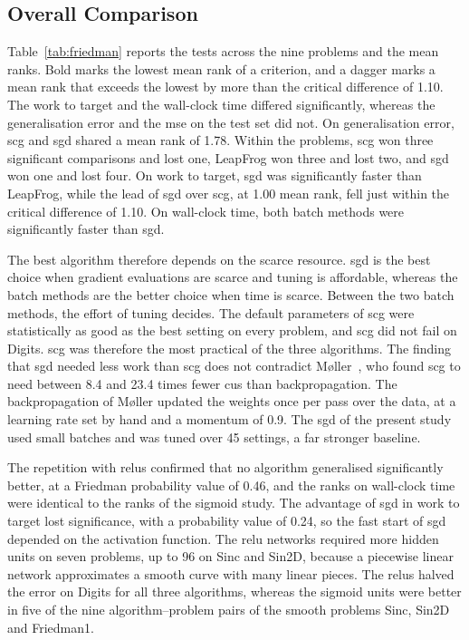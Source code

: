 \documentclass[conference]{IEEEtran}
\begin{document}
\subsection{Overall Comparison}

Table~\ref{tab:friedman} reports the tests across the nine problems and the mean
ranks. Bold marks the lowest mean rank of a criterion, and a dagger marks a mean
rank that exceeds the lowest by more than the critical difference of 1.10. The work to target and the wall-clock time differed significantly, whereas the
generalisation error and the \gls{mse} on the test set did not. On
generalisation error, \gls{scg} and \gls{sgd} shared a mean rank of 1.78. Within the problems, \gls{scg} won three significant comparisons and lost one,
LeapFrog won three and lost two, and \gls{sgd} won one and lost four. On work to target,
\gls{sgd} was significantly faster than LeapFrog, while the lead of \gls{sgd} over
\gls{scg}, at 1.00 mean rank, fell just within the critical difference of 1.10. On
wall-clock time, both batch methods were significantly faster than \gls{sgd}.

\begin{table}[t]
\centering
\caption{Tests across the nine problems and mean ranks}
\label{tab:friedman}
\footnotesize
\setlength{\tabcolsep}{3pt}

\end{table}

The best algorithm therefore depends on the scarce resource. \Gls{sgd} is the best
choice when gradient evaluations are scarce and tuning is affordable, whereas the
batch methods are the better choice when time is scarce. Between the two batch
methods, the effort of tuning decides. The default parameters of \gls{scg} were statistically as
good as the best setting on every problem, and \gls{scg} did not fail on Digits.
\Gls{scg} was therefore the most practical of the three algorithms. The finding that
\gls{sgd} needed less work than \gls{scg} does not contradict
M{\o}ller~\cite{moller1993}, who found \gls{scg} to need between 8.4
and 23.4 times fewer \glspl{cu} than backpropagation. The backpropagation of
M{\o}ller updated the weights once per pass over the data, at a learning rate set
by hand and a momentum of 0.9. The \gls{sgd} of the present study used small
batches and was tuned over 45 settings, a far stronger baseline.

The repetition with \glspl{relu} confirmed that no algorithm generalised
significantly better, at a Friedman probability value of 0.46, and the ranks on
wall-clock time were identical to the ranks of the sigmoid study. The advantage of \gls{sgd} in work to target lost significance, with a
probability value of 0.24, so the fast start of \gls{sgd} depended on the
activation function. The \gls{relu} networks required more hidden units on seven
problems, up to 96 on Sinc and Sin2D, because a piecewise linear network
approximates a smooth curve with many linear pieces. The \glspl{relu} halved the
error on Digits for all three algorithms, whereas the sigmoid units were better in five of the nine algorithm--problem
pairs of the smooth problems Sinc, Sin2D and Friedman1.
\end{document}
